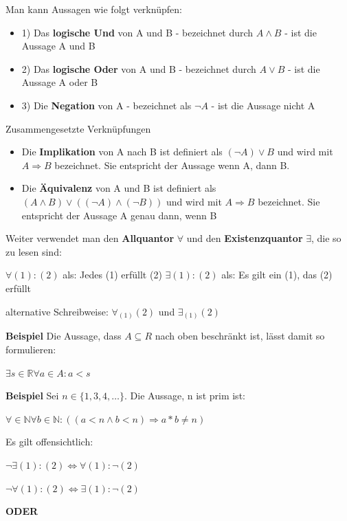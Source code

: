 \documentclass{scrartcl}
\newcommand{\qq}[1]{\glqq #1\grqq}
\begin{document}
Man kann Aussagen wie folgt verknüpfen:

\begin{itemize}
  \item 1) Das \textbf{logische Und} von A und B - bezeichnet durch $A \wedge B$ - ist die Aussage \qq{A und B}
  \item 2) Das \textbf{logische Oder} von A und B - bezeichnet durch $A \vee B$ - ist die Aussage \qq{A oder B}
  \item 3) Die \textbf{Negation} von A - bezeichnet als $\lnot A$ - ist die Aussage \qq{nicht A}
\end{itemize}

Zusammengesetzte Verknüpfungen

\begin{itemize}
  \item Die \textbf{Implikation} von A nach B ist definiert als $(\lnot A) \vee B$ und wird mit $A \Longrightarrow B$ bezeichnet. Sie entspricht der Aussage \qq{wenn A, dann B}.
  \item Die \textbf{Äquivalenz} von A und B ist definiert als $(A \wedge B) \vee ((\lnot A)\wedge(\lnot B)) $ und wird mit $A \Longrightarrow B$ bezeichnet. Sie entspricht der Aussage \qq{A genau dann, wenn B}
\end{itemize}

Weiter verwendet man den \textbf{Allquantor} $\forall$ und den \textbf{Existenzquantor} $\exists$, die so zu lesen sind:

$\forall (1) : (2)$ \quad als: \quad Jedes (1) erfüllt (2)
$\exists (1) : (2)$ \quad als: \quad Es gilt ein (1), das (2) erfüllt

alternative Schreibweise: $\forall_{(1)} (2)$ und $\exists_{(1)} (2)$

\textbf{Beispiel} Die Aussage, dass $A \subseteq R$ nach oben beschränkt ist, lässt damit so formulieren:

$\exists s \in \mathbb{R} \forall a \in A: a < s$

\textbf{Beispiel} Sei $n \in \{1,3,4,\ldots\}$. Die Aussage, \qq{n ist prim} ist:

$ \forall \in \mathbb{N} \forall b \in \mathbb{N}:((a<n \wedge b < n) \Longrightarrow a*b \neq n)$

Es gilt offensichtlich: 

$\lnot \exists (1) : (2) \Longleftrightarrow \forall (1):\lnot (2)$

$\lnot \forall (1) : (2) \Longleftrightarrow \exists (1):\lnot (2)$

\textbf{ODER}
\end{document}
